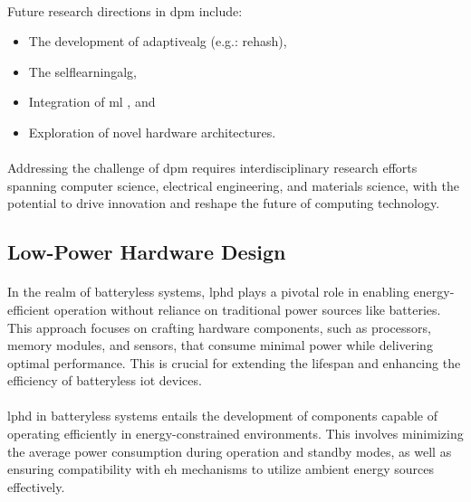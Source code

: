         \paragraph{}
        Future research directions in \gls{dpm} include:
        \begin{itemize}
            \item The development of \gls{adaptivealg} (e.g.: \gls{rehash}),
            \item The \gls{selflearningalg},
            \item Integration of \gls{ml} \cite{SABOVIC2023100736}, and
            \item Exploration of novel hardware architectures.
        \end{itemize}

        \paragraph{}
        Addressing the challenge of \gls{dpm} requires interdisciplinary research efforts spanning computer science, electrical engineering, and materials science, with the potential to drive innovation and reshape the future of computing technology.
        

    \subsection{Low-Power Hardware Design}

        \paragraph{}
        In the realm of batteryless systems, \gls{lphd} plays a pivotal role in enabling energy-efficient operation without reliance on traditional power sources like batteries. This approach focuses on crafting hardware components, such as processors, memory modules, and sensors, that consume minimal power while delivering optimal performance. This is crucial for extending the lifespan and enhancing the efficiency of batteryless \gls{iot} devices\cite{ultraLowPowerIntegratedCircuitDesign}.

        \paragraph{}
        \gls{lphd} in batteryless systems entails the development of components capable of operating efficiently in energy-constrained environments. This involves minimizing the average power consumption during operation and standby modes, as well as ensuring compatibility with \gls{eh} mechanisms to utilize ambient energy sources effectively.

